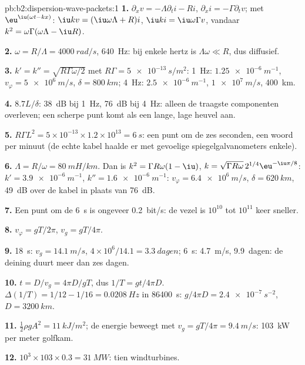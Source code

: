 \begin{solution}{pb:b2:dispersion-wave-packets:1}
\textbf{1.} $\partial_xv = -\Lambda\partial_ti - Ri$,
$\partial_xi = -\Gamma\partial_tv$; met $\eu^{\iu(\omega t - kx)}$:
$\iu kv = (\iu\omega\Lambda + R)i$, $\iu ki = \iu\omega\Gamma v$, vandaar
$k^2 = \omega\Gamma(\omega\Lambda - \iu R)$.

\textbf{2.} $\omega = R/\Lambda = \qty{4000}{rad/s}$, \qty{640}{Hz}: bij
enkele hertz is $\Lambda\omega
\ll R$, dus diffusief.

\textbf{3.} $k' = k'' = \sqrt{R\Gamma\omega/2}$ met
$R\Gamma = \qty{5e-13}{s/m^2}$: \qty{1}{Hz}: $\qty{1.25e-6}{m^{-1}}$,
$v_\varphi = \qty{5e6}{m/s}$, $\delta = \qty{800}{km}$; \qty{4}{Hz}:
$\qty{2.5e-6}{m^{-1}}$, $\qty{1e7}{m/s}$, \qty{400}{km}.

\textbf{4.} $8.7L/\delta$: \qty{38}{dB} bij \qty{1}{Hz}, \qty{76}{dB} bij
\qty{4}{Hz}: alleen de traagste componenten overleven; een scherpe punt komt
als een lange, lage heuvel aan.

\textbf{5.}
$R\Gamma L^2 = 5 \times 10^{-13} \times 1.2 \times 10^{13} = \qty{6}{s}$:
een punt om de zes seconden, een woord per minuut (de echte kabel haalde er
met gevoelige spiegelgalvanometers enkele).

\textbf{6.} $\Lambda = R/\omega = \qty{80}{mH/km}$. Dan is
$k^2 = \Gamma R\omega(1 - \iu)$,
$k = \sqrt{\Gamma R\omega}
\,2^{1/4}\eu^{-\iu\pi/8}$:
$k' = \qty{3.9e-6}{m^{-1}}$, $k'' = \qty{1.6e-6}{m^{-1}}$:
$v_\varphi =
\qty{6.4e6}{m/s}$, $\delta = \qty{620}{km}$, \qty{49}{dB} over
de kabel in plaats van \qty{76}{dB}.

\textbf{7.} Een punt om de \qty{6}{s} is ongeveer \qty{0.2}{bit/s}: de vezel
is $10^{10}$ tot $10^{11}$ keer sneller.

\textbf{8.} $v_\varphi = gT/2\pi$, $v_g = gT/4\pi$.

\textbf{9.} \qty{18}{s}: $v_g = \qty{14.1}{m/s}$,
$4 \times 10^6/14.1 = \qty{3.3}{dagen}$; \qty{6}{s}: \qty{4.7}{m/s},
\qty{9.9}{dagen}: de deining duurt meer dan zes dagen.

\textbf{10.} $t = D/v_g = 4\pi D/gT$, dus $1/T = gt/4\pi D$.
$\Delta(1/T) = 1/12 - 1/16
= \qty{0.0208}{Hz}$ in \qty{86400}{s}:
$g/4\pi D = \qty{2.4e-7}{s^{-2}}$, $D = \qty{3200}{km}$.

\textbf{11.} $\tfrac12\rho gA^2 = \qty{11}{kJ/m^2}$; de energie beweegt met
$v_g = gT/4\pi =
\qty{9.4}{m/s}$: \qty{103}{kW} per meter golfkam.

\textbf{12.} $10^3 \times 103 \times 0.3 = \qty{31}{MW}$: tien windturbines.


\end{solution}
